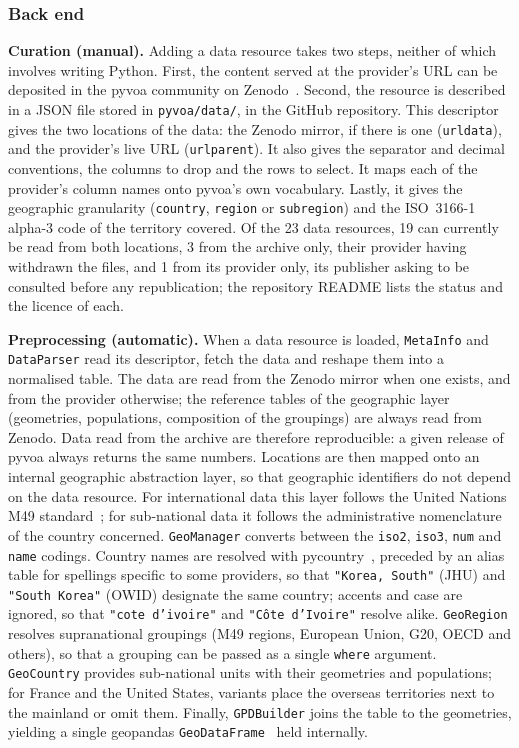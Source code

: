 \documentclass[preprint,12pt,a4paper]{elsarticle}
\begin{document}
\subsubsection{Back end}

\textbf{Curation (manual).} Adding a data resource takes two steps, neither of
which involves writing Python. First, the content served at the provider's URL
can be deposited in the pyvoa community on Zenodo~\cite{zenodo_pyvoa}. Second, the resource is described in a JSON file stored
in \texttt{pyvoa/data/}, in the GitHub repository. This descriptor gives the
two locations of the data: the Zenodo mirror, if there is one (\texttt{urldata}), and the
provider's live URL (\texttt{urlparent}). It also gives the separator and
decimal conventions, the columns to drop and the rows to select. It maps each
of the provider's column names onto pyvoa's own vocabulary. Lastly, it gives the geographic granularity
(\texttt{country}, \texttt{region} or \texttt{subregion}) and the ISO~3166-1
alpha-3 code of the territory covered. Of the 23
data resources, 19 can currently be read from both locations, 3 from the
archive only, their provider having withdrawn the files, and 1 from its
provider only, its publisher asking to be consulted before any republication;
the repository README lists the status and the licence of each. 


\textbf{Preprocessing (automatic).} When a data resource is loaded,
\texttt{MetaInfo} and \texttt{DataParser} read its descriptor, fetch the data
and reshape them into a normalised table. The data are read from the Zenodo
mirror when one exists, and from the provider otherwise; the reference tables
of the geographic layer (geometries, populations, composition of the
groupings) are always read from Zenodo. Data read from the archive are
therefore reproducible: a given release of pyvoa always returns the same
numbers. Locations are then mapped onto an internal geographic abstraction
layer, so that geographic identifiers do not depend on the data resource. For
international data this layer follows the United Nations M49
standard~\cite{geoscheme}; for sub-national data it follows the administrative
nomenclature of the country concerned. \texttt{GeoManager} converts between
the \texttt{iso2}, \texttt{iso3}, \texttt{num} and \texttt{name} codings.
Country names are resolved with pycountry~\cite{pycountry}, preceded by an
alias table for spellings specific to some providers, so that
\texttt{"Korea, South"} (JHU) and \texttt{"South Korea"} (OWID) designate the
same country; accents and case are ignored, so that \texttt{"cote d'ivoire"}
and \texttt{"Côte d'Ivoire"} resolve alike. \texttt{GeoRegion} resolves
supranational groupings (M49 regions, European Union, G20, OECD and others),
so that a grouping can be passed as a single \texttt{where} argument.
\texttt{GeoCountry} provides sub-national units with their geometries and
populations; for France and the United States, variants place the overseas
territories next to the mainland or omit them. Finally, \texttt{GPDBuilder}
joins the table to the geometries, yielding a single geopandas
\texttt{GeoDataFrame}~\cite{geopandas} held internally.
\end{document}
